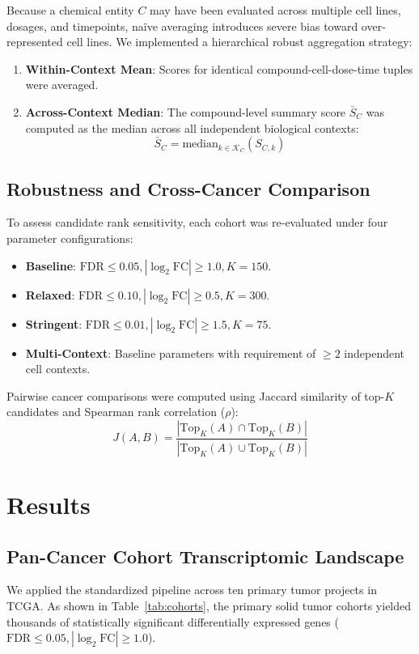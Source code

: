 \documentclass[10pt,journal,compsoc,twocolumn]{IEEEtran}
\begin{document}
Because a chemical entity $C$ may have been evaluated across multiple cell lines, dosages, and timepoints, naïve averaging introduces severe bias toward over-represented cell lines. We implemented a hierarchical robust aggregation strategy:
\begin{enumerate}
    \item \textbf{Within-Context Mean}: Scores for identical compound-cell-dose-time tuples were averaged.
    \item \textbf{Across-Context Median}: The compound-level summary score $\bar{S}_C$ was computed as the median across all independent biological contexts:
    \begin{equation}
        \bar{S}_C = \text{median}_{k \in \mathcal{K}_C} (S_{C, k})
    \end{equation}
\end{enumerate}

\subsection{Robustness and Cross-Cancer Comparison}
To assess candidate rank sensitivity, each cohort was re-evaluated under four parameter configurations:
\begin{itemize}
    \item \textbf{Baseline}: $\text{FDR} \le 0.05, |\log_2\text{FC}| \ge 1.0, K=150$.
    \item \textbf{Relaxed}: $\text{FDR} \le 0.10, |\log_2\text{FC}| \ge 0.5, K=300$.
    \item \textbf{Stringent}: $\text{FDR} \le 0.01, |\log_2\text{FC}| \ge 1.5, K=75$.
    \item \textbf{Multi-Context}: Baseline parameters with requirement of $\ge 2$ independent cell contexts.
\end{itemize}

Pairwise cancer comparisons were computed using Jaccard similarity of top-$K$ candidates and Spearman rank correlation ($\rho$):
\begin{equation}
    J(A, B) = \frac{|\text{Top}_K(A) \cap \text{Top}_K(B)|}{|\text{Top}_K(A) \cup \text{Top}_K(B)|}
\end{equation}

\section{Results}

\subsection{Pan-Cancer Cohort Transcriptomic Landscape}
We applied the standardized pipeline across ten primary tumor projects in TCGA. As shown in Table~\ref{tab:cohorts}, the primary solid tumor cohorts yielded thousands of statistically significant differentially expressed genes ($\text{FDR} \le 0.05, |\log_2\text{FC}| \ge 1.0$).
\end{document}
